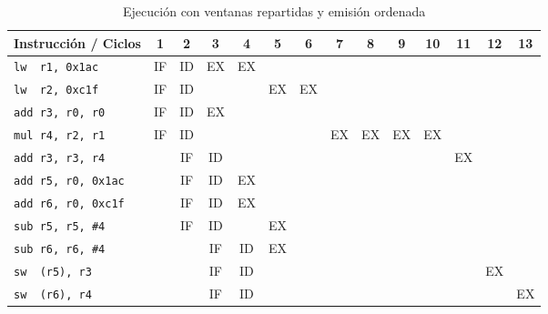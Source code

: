\begin{ejercicio}
\begin{table}[H]
\centering
\scriptsize
\begin{tabular}{|l|c|c|c|c|c|c|c|c|c|c|c|c|c|}
    \hline
    Instrucción / Ciclos & 1 & 2 & 3 & 4 & 5 & 6 & 7 & 8 & 9 & 10 & 11 & 12 & 13 \\
    \hline
    \verb|lw  r1, 0x1ac|     & IF & ID & EX & EX & & & & & & & & & \\
    \hline        
    \verb|lw  r2, 0xc1f|     & IF & ID & & & EX & EX & & & & & & & \\
    \hline           
    \verb|add r3, r0, r0|    & IF & ID & EX & & & & & & & & & & \\
    \hline                        
    \verb|mul r4, r2, r1|    & IF & ID & & & & & EX & EX & EX & EX & & & \\
    \hline            
    \verb|add r3, r3, r4|    & & IF & ID & & & & & & & & EX & & \\
    \hline
    \verb|add r5, r0, 0x1ac| & & IF & ID & EX & & & & & & & & & \\
    \hline
    \verb|add r6, r0, 0xc1f| & & IF & ID & EX & & & & & & & & & \\
    \hline
    \verb|sub r5, r5, #4|    & & IF & ID & & EX & & & & & & & & \\
    \hline            
    \verb|sub r6, r6, #4|    & & & IF & ID & EX & & & & & & & & \\
    \hline
    \verb|sw  (r5), r3|      & & & IF & ID & & & & & & & & EX & \\
    \hline
    \verb|sw  (r6), r4|      & & & IF & ID & & & & & & & & & EX \\
    \hline
\end{tabular}
\caption{Ejecución con ventanas repartidas y emisión ordenada}
\end{table}

\end{ejercicio}

